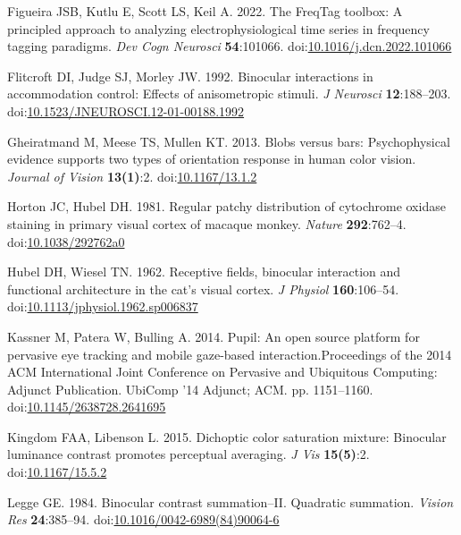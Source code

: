\documentclass[
]{article}
\newlength{\cslhangindent}
\newlength{\cslentryspacingunit} %
\newenvironment{CSLReferences}[2] %
 {%
  \setlength{\parindent}{0pt}
  \ifodd #1
  \let\oldpar\par
  \def\par{\hangindent=\cslhangindent\oldpar}
  \fi
  \setlength{\parskip}{#2\cslentryspacingunit}
 }%
 {}
\begin{document}
\begin{CSLReferences}{1}{0}
\leavevmode{}%
Figueira JSB, Kutlu E, Scott LS, Keil A. 2022. The FreqTag toolbox: A principled approach to analyzing electrophysiological time series in frequency tagging paradigms. \emph{Dev Cogn Neurosci} \textbf{54}:101066. doi:\href{https://doi.org/10.1016/j.dcn.2022.101066}{10.1016/j.dcn.2022.101066}

\leavevmode{}%
Flitcroft DI, Judge SJ, Morley JW. 1992. Binocular interactions in accommodation control: Effects of anisometropic stimuli. \emph{J Neurosci} \textbf{12}:188--203. doi:\href{https://doi.org/10.1523/JNEUROSCI.12-01-00188.1992}{10.1523/JNEUROSCI.12-01-00188.1992}

\leavevmode{}%
Gheiratmand M, Meese TS, Mullen KT. 2013. Blobs versus bars: Psychophysical evidence supports two types of orientation response in human color vision. \emph{Journal of Vision} \textbf{13(1)}:2. doi:\href{https://doi.org/10.1167/13.1.2}{10.1167/13.1.2}

\leavevmode{}%
Horton JC, Hubel DH. 1981. Regular patchy distribution of cytochrome oxidase staining in primary visual cortex of macaque monkey. \emph{Nature} \textbf{292}:762--4. doi:\href{https://doi.org/10.1038/292762a0}{10.1038/292762a0}

\leavevmode{}%
Hubel DH, Wiesel TN. 1962. Receptive fields, binocular interaction and functional architecture in the cat's visual cortex. \emph{J Physiol} \textbf{160}:106--54. doi:\href{https://doi.org/10.1113/jphysiol.1962.sp006837}{10.1113/jphysiol.1962.sp006837}

\leavevmode{}%
Kassner M, Patera W, Bulling A. 2014. Pupil: An open source platform for pervasive eye tracking and mobile gaze-based interaction.Proceedings of the 2014 {ACM} International Joint Conference on Pervasive and Ubiquitous Computing: Adjunct Publication. UbiComp '14 Adjunct; {ACM}. pp. 1151--1160. doi:\href{https://doi.org/10.1145/2638728.2641695}{10.1145/2638728.2641695}

\leavevmode{}%
Kingdom FAA, Libenson L. 2015. Dichoptic color saturation mixture: Binocular luminance contrast promotes perceptual averaging. \emph{J Vis} \textbf{15(5)}:2. doi:\href{https://doi.org/10.1167/15.5.2}{10.1167/15.5.2}

\leavevmode{}%
Legge GE. 1984. Binocular contrast summation--II. Quadratic summation. \emph{Vision Res} \textbf{24}:385--94. doi:\href{https://doi.org/10.1016/0042-6989(84)90064-6}{10.1016/0042-6989(84)90064-6}


\end{CSLReferences}
\end{document}
